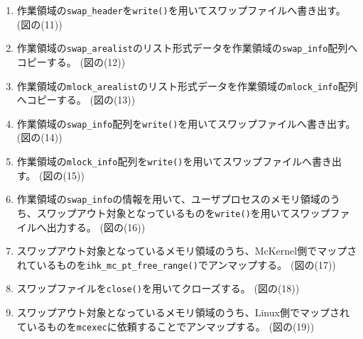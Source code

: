 \documentclass[twoside,11pt,fleqn]{book}
\begin{document}
\begin{enumerate}
\item 作業領域の\texttt{swap\_header}を\texttt{write()}を用いてスワップファイルへ書き出す。 (図の(11))
\item 作業領域の\texttt{swap\_arealist}のリスト形式データを作業領域の\texttt{swap\_info}配列へコピーする。 (図の(12))
\item 作業領域の\texttt{mlock\_arealist}のリスト形式データを作業領域の\texttt{mlock\_info}配列へコピーする。 (図の(13))
\item 作業領域の\texttt{swap\_info}配列を\texttt{write()}を用いてスワップファイルへ書き出す。 (図の(14))
\item 作業領域の\texttt{mlock\_info}配列を\texttt{write()}を用いてスワップファイルへ書き出す。 (図の(15))
\item 作業領域の\texttt{swap\_info}の情報を用いて、ユーザプロセスのメモリ領域のうち、スワップアウト対象となっているものを\texttt{write()}を用いてスワップファイルへ出力する。 (図の(16))
\item スワップアウト対象となっているメモリ領域のうち、McKernel側でマップされているものを\texttt{ihk\_mc\_pt\_free\_range()}でアンマップする。 (図の(17))
\item スワップファイルを\texttt{close()}を用いてクローズする。 (図の(18))
\item スワップアウト対象となっているメモリ領域のうち、Linux側でマップされているものを\texttt{mcexec}に依頼することでアンマップする。 (図の(19))
\end{enumerate}
\end{document}
